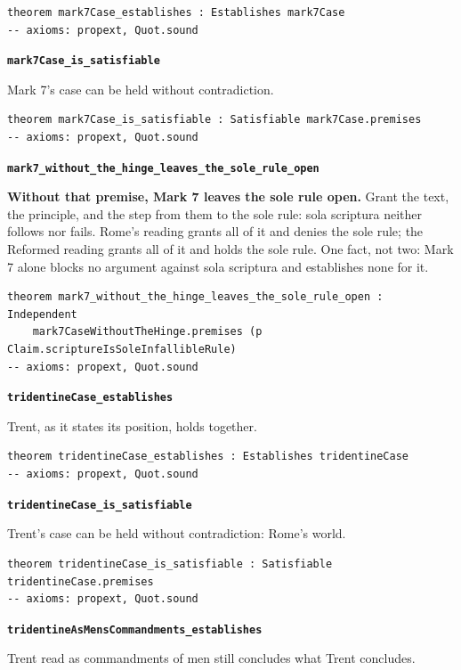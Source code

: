 \documentclass[11pt]{article}
\begin{document}
{\small\begin{verbatim}
theorem mark7Case_establishes : Establishes mark7Case
-- axioms: propext, Quot.sound
\end{verbatim}}
\par\medskip\noindent\textbf{\texttt{mark7\allowbreak{}Case\_\allowbreak{}is\_\allowbreak{}satisfiable}}\par\nobreak\noindent
Mark 7's case can be held without contradiction.

{\small\begin{verbatim}
theorem mark7Case_is_satisfiable : Satisfiable mark7Case.premises
-- axioms: propext, Quot.sound
\end{verbatim}}
\par\medskip\noindent\textbf{\texttt{mark7\_\allowbreak{}without\_\allowbreak{}the\_\allowbreak{}hinge\_\allowbreak{}leaves\_\allowbreak{}the\_\allowbreak{}sole\_\allowbreak{}rule\_\allowbreak{}open}}\par\nobreak\noindent
\textbf{Without that premise, Mark 7 leaves the sole rule open.} Grant the text, the principle, and the step from them to the sole rule: sola scriptura neither follows nor fails. Rome's reading grants all of it and denies the sole rule; the Reformed reading grants all of it and holds the sole rule. One fact, not two: Mark 7 alone blocks no argument against sola scriptura and establishes none for it.

{\small\begin{verbatim}
theorem mark7_without_the_hinge_leaves_the_sole_rule_open : Independent
    mark7CaseWithoutTheHinge.premises (p Claim.scriptureIsSoleInfallibleRule)
-- axioms: propext, Quot.sound
\end{verbatim}}
\par\medskip\noindent\textbf{\texttt{tridentine\allowbreak{}Case\_\allowbreak{}establishes}}\par\nobreak\noindent
Trent, as it states its position, holds together.

{\small\begin{verbatim}
theorem tridentineCase_establishes : Establishes tridentineCase
-- axioms: propext, Quot.sound
\end{verbatim}}
\par\medskip\noindent\textbf{\texttt{tridentine\allowbreak{}Case\_\allowbreak{}is\_\allowbreak{}satisfiable}}\par\nobreak\noindent
Trent's case can be held without contradiction: Rome's world.

{\small\begin{verbatim}
theorem tridentineCase_is_satisfiable : Satisfiable tridentineCase.premises
-- axioms: propext, Quot.sound
\end{verbatim}}
\par\medskip\noindent\textbf{\texttt{tridentine\allowbreak{}As\allowbreak{}Mens\allowbreak{}Commandments\_\allowbreak{}establishes}}\par\nobreak\noindent
Trent read as commandments of men still concludes what Trent concludes.
\end{document}

